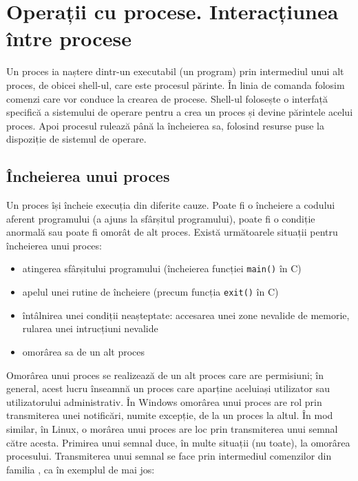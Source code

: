 \section{Operații cu procese. Interacțiunea între procese}
\label{sec:procese-operatii}

Un proces ia naștere dintr-un executabil (un program) prin intermediul unui alt
proces, de obicei shell-ul, care este procesul părinte. În linia de comanda
folosim comenzi care vor conduce la crearea de procese. Shell-ul folosește o
interfață specifică a sistemului de operare pentru a crea un proces și devine
părintele acelui proces. Apoi procesul rulează până la încheierea sa, folosind
resurse puse la dispoziție de sistemul de operare.

\subsection{Încheierea unui proces}
\label{sec:procese-operatii-incheiere}

Un proces își încheie execuția din diferite cauze. Poate fi o încheiere a
codului aferent programului (a ajuns la sfârșitul programului), poate fi o
condiție anormală sau poate fi omorât de alt proces. Există următoarele situații
pentru încheierea unui proces:

\begin{itemize}
  \item atingerea sfârșitului programului (încheierea funcției \texttt{main()} în
		C)
              \item apelul unei rutine de încheiere (precum funcția \texttt{exit()} în C)
	\item întâlnirea unei condiții neașteptate: accesarea unei zone nevalide
		de memorie, rularea unei intrucțiuni nevalide
	\item omorârea sa de un alt proces
\end{itemize}

Omorârea unui proces se realizează de un alt proces care are permisiuni; în
general, acest lucru înseamnă un proces care aparține aceluiași utilizator sau
utilizatorului administrativ. În Windows omorârea unui proces are rol prin
transmiterea unei notificări, numite excepție, de la un proces la altul. În mod
similar, în Linux, o morârea unui proces are loc prin transmiterea unui semnal
către acesta. Primirea unui semnal duce, în multe situații (nu toate), la
omorârea procesului. Transmiterea unui semnal se face prin intermediul
comenzilor din familia , ca în exemplul de mai jos:

